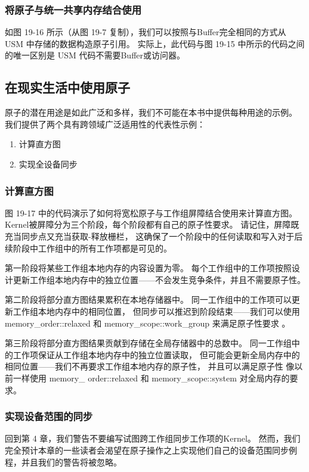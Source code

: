 \subsubsection{将原子与统一共享内存结合使用}
如图 19-16 所示（从图 19-7 复制），我们可以按照与Buffer完全相同的方式从 USM 中存储的数据构造原子引用。 
实际上，此代码与图 19-15 中所示的代码之间的唯一区别是 USM 代码不需要Buffer或访问器。

\subsection{在现实生活中使用原子}
原子的潜在用途是如此广泛和多样，我们不可能在本书中提供每种用途的示例。 
我们提供了两个具有跨领域广泛适用性的代表性示例：

\begin{enumerate}
	\item 计算直方图

	\item 实现全设备同步
\end{enumerate}

\subsubsection{计算直方图}
图 19-17 中的代码演示了如何将宽松原子与工作组屏障结合使用来计算直方图。 
Kernel被屏障分为三个阶段，每个阶段都有自己的原子性要求。 
请记住，屏障既充当同步点又充当获取-释放栅栏，
这确保了一个阶段中的任何读取和写入对于后续阶段中工作组中的所有工作项都是可见的。

第一阶段将某些工作组本地内存的内容设置为零。 
每个工作组中的工作项按照设计更新工作组本地内存中的独立位置——不会发生竞争条件，并且不需要原子性。

第二阶段将部分直方图结果累积在本地存储器中。 
同一工作组中的工作项可以更新工作组本地内存中的相同位置，
但同步可以推迟到阶段结束——我们可以使用 memory\_order::relaxed 
和 memory\_scope::work\_group 来满足原子性要求 。

第三阶段将部分直方图结果贡献到存储在全局存储器中的总数中。 
同一工作组中的工作项保证从工作组本地内存中的独立位置读取，
但可能会更新全局内存中的相同位置——我们不再要求工作组本地内存的原子性，
并且可以满足原子性 像以前一样使用 memory\_ order::relaxed 和 memory\_scope::system 对全局内存的要求。

\subsubsection{实现设备范围的同步}
回到第 4 章，我们警告不要编写试图跨工作组同步工作项的Kernel。 
然而，我们完全预计本章的一些读者会渴望在原子操作之上实现他们自己的设备范围同步例程，并且我们的警告将被忽略。

